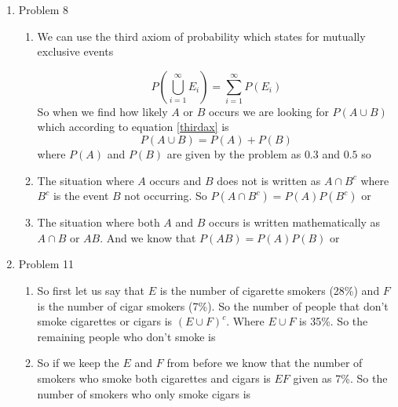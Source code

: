 \documentclass[11pt]{article}
\begin{document}
\begin{enumerate}
\item Problem 8 
\begin{enumerate}
\item
We can use the third axiom of probability which states for mutually exclusive events

\begin{equation}
P\left(\bigcup_{i=1}^{\infty} E_i\right) = \sum_{i=1}^{\infty} P(E_i)
\label{thirdax}
\end{equation}
So when we find how likely $A$ or $B$ occurs we are looking for $P(A\cup B)$ which according to equation \ref{thirdax} is
$$P(A \cup B) = P(A) + P(B)$$
where $P(A)$ and $P(B)$ are given by the problem as $0.3$ and $0.5$ so
\begin{center}
\end{center}

\item
The situation where $A$ occurs and $B$ does not is written as $A\cap B^c$ where $B^c$ is the event $B$ not occurring. So $P(A\cap B^c) = P(A)P(B^c)$ or 
\begin{center}
\end{center}

\item
The situation where both $A$ and $B$ occurs is written mathematically as $A\cap B$ or $AB$. And we know that $P(AB) = P(A)P(B)$ or
\begin{center}
\end{center}
\end{enumerate}

\item Problem 11 
\begin{enumerate}
\item
So first let us say that $E$ is the number of cigarette smokers (28\%) and $F$ is the number of cigar smokers (7\%). So the number of people that don't smoke cigarettes or cigars is $(E\cup F)^c$. Where $E\cup F$ is 35\%. So the remaining people who don't smoke is 
\begin{center}
\end{center}

\item
So if we keep the $E$ and $F$ from before we know that the number of smokers who smoke both cigarettes and cigars is $EF$ given as 7\%. So the number of smokers who only smoke cigars is
\begin{center}
\end{center}
\end{enumerate}


\end{enumerate}
\end{document}
